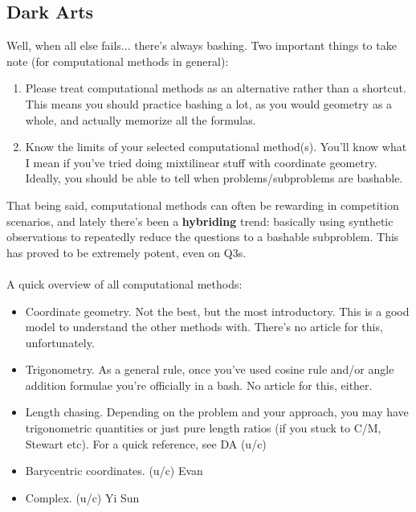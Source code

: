 	\subsection{Dark Arts}
	Well, when all else fails... there's always bashing.
	Two important things to take note (for computational methods in general):
	\begin{enumerate}
	\item Please treat computational methods as an alternative rather than a shortcut. This means you should practice bashing a lot, as you would geometry as a whole, and actually memorize all the formulas.
	\item Know the limits of your selected computational method(s). You'll know what I mean if you've tried doing mixtilinear stuff with coordinate geometry. Ideally, you should be able to tell when problems/subproblems are bashable.
	\end{enumerate}
	That being said, computational methods can often be rewarding in competition scenarios, and lately there's been a \textbf{hybriding} trend: basically using synthetic observations to repeatedly reduce the questions to a bashable subproblem. This has proved to be extremely potent, even on Q3s.\\\\
	A quick overview of all computational methods:
	\begin{itemize}
	\item Coordinate geometry. Not the best, but the most introductory. This is a good model to understand the other methods with. There's no article for this, unfortunately.
	\item Trigonometry. As a general rule, once you've used cosine rule and/or angle addition formulae you're officially in a bash. No article for this, either.
	\item Length chasing. Depending on the problem and your approach, you may have trigonometric quantities or just pure length ratios (if you stuck to C/M, Stewart etc). For a quick reference, see DA (u/c)
	\item Barycentric coordinates. (u/c) Evan
	\item Complex. (u/c) Yi Sun
	\end{itemize}
